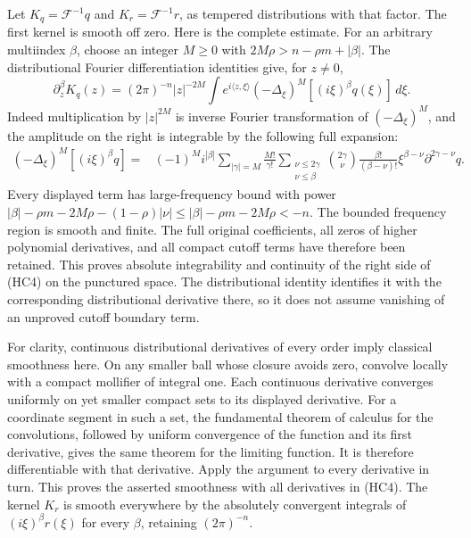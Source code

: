 \documentclass[
  11pt,
]{article}
\begin{document}
Let \(K_q=\mathcal F^{-1}q\) and \(K_r=\mathcal F^{-1}r\), as tempered
distributions with that factor. The first kernel is smooth off zero.
Here is the complete estimate. For an arbitrary multiindex \(\beta\),
choose an integer \(M\ge0\) with \(2M\rho>n-\rho m+|\beta|\). The
distributional Fourier differentiation identities give, for \(z\ne0\),
\[
\partial_z^\beta K_q(z)=(2\pi)^{-n}|z|^{-2M}
 \int e^{i\langle z,\xi\rangle}(-\Delta_\xi)^M[(i\xi)^\beta q(\xi)]\,d\xi.
\tag{HC4}
\] Indeed multiplication by \(|z|^{2M}\) is inverse Fourier
transformation of \((-\Delta_\xi)^M\), and the amplitude on the right is
integrable by the following full expansion: \[
\begin{aligned}
(-\Delta_\xi)^M[(i\xi)^\beta q]
={}&(-1)^Mi^{|\beta|}
 \sum_{|\gamma|=M}\frac{M!}{\gamma!}
 \sum_{\substack{\nu\le2\gamma\\\nu\le\beta}}
 \binom{2\gamma}{\nu}\frac{\beta!}{(\beta-\nu)!}
 \xi^{\beta-\nu}\partial^{2\gamma-\nu}q.
\end{aligned}
\tag{HC5}
\] Every displayed term has large-frequency bound with power
\(|\beta|-\rho m-2M\rho-(1-\rho)|\nu|\le|\beta|-\rho m-2M\rho<-n\). The
bounded frequency region is smooth and finite. The full original
coefficients, all zeros of higher polynomial derivatives, and all
compact cutoff terms have therefore been retained. This proves absolute
integrability and continuity of the right side of (HC4) on the punctured
space. The distributional identity identifies it with the corresponding
distributional derivative there, so it does not assume vanishing of an
unproved cutoff boundary term.

For clarity, continuous distributional derivatives of every order imply
classical smoothness here. On any smaller ball whose closure avoids
zero, convolve locally with a compact mollifier of integral one. Each
continuous derivative converges uniformly on yet smaller compact sets to
its displayed derivative. For a coordinate segment in such a set, the
fundamental theorem of calculus for the convolutions, followed by
uniform convergence of the function and its first derivative, gives the
same theorem for the limiting function. It is therefore differentiable
with that derivative. Apply the argument to every derivative in turn.
This proves the asserted smoothness with all derivatives in (HC4). The
kernel \(K_r\) is smooth everywhere by the absolutely convergent
integrals of \((i\xi)^\beta r(\xi)\) for every \(\beta\), retaining
\((2\pi)^{-n}\).
\end{document}
